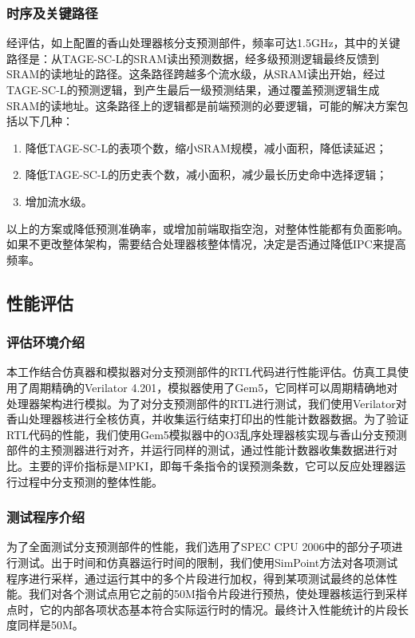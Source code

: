 \subsubsection*{时序及关键路径}
经评估，如上配置的香山处理器核分支预测部件，频率可达1.5GHz，其中的关键路径是：从TAGE-SC-L的SRAM读出预测数据，经多级预测逻辑最终反馈到SRAM的读地址的路径。这条路径跨越多个流水级，从SRAM读出开始，经过TAGE-SC-L的预测逻辑，到产生最后一级预测结果，通过覆盖预测逻辑生成SRAM的读地址。这条路径上的逻辑都是前端预测的必要逻辑，可能的解决方案包括以下几种：
\begin{enumerate}
    \item 降低TAGE-SC-L的表项个数，缩小SRAM规模，减小面积，降低读延迟；
    \item 降低TAGE-SC-L的历史表个数，减小面积，减少最长历史命中选择逻辑；
    \item 增加流水级。
\end{enumerate}
以上的方案或降低预测准确率，或增加前端取指空泡，对整体性能都有负面影响。如果不更改整体架构，需要结合处理器核整体情况，决定是否通过降低IPC来提高频率。
\subsection{性能评估}
\subsubsection{评估环境介绍}
本工作结合仿真器和模拟器对分支预测部件的RTL代码进行性能评估。仿真工具使用了周期精确的Verilator 4.201，模拟器使用了Gem5，它同样可以周期精确地对处理器架构进行模拟。为了对分支预测部件的RTL进行测试，我们使用Verilator对香山处理器核进行全核仿真，并收集运行结束打印出的性能计数器数据。为了验证RTL代码的性能，我们使用Gem5模拟器中的O3乱序处理器核实现与香山分支预测部件的主预测器进行对齐，并运行同样的测试，通过性能计数器收集数据进行对比。主要的评价指标是MPKI，即每千条指令的误预测条数，它可以反应处理器运行过程中分支预测的整体性能。

\subsubsection{测试程序介绍}
为了全面测试分支预测部件的性能，我们选用了SPEC CPU 2006\cite{henning2006spec}中的部分子项进行测试。出于时间和仿真器运行时间的限制，我们使用SimPoint方法对各项测试程序进行采样，通过运行其中的多个片段进行加权，得到某项测试最终的总体性能。我们对各个测试点用它之前的50M指令片段进行预热，使处理器核运行到采样点时，它的内部各项状态基本符合实际运行时的情况。最终计入性能统计的片段长度同样是50M。

